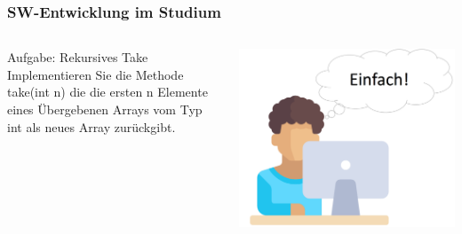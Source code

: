 \begin{frame}[fragile]
	\frametitle{SW-Entwicklung im Studium}
	\begin{columns}
		\begin{column}{.5\textwidth}
			Aufgabe: Rekursives Take
			\newline\newline
			Implementieren Sie die Methode take(int n) die
			die ersten n Elemente eines Übergebenen Arrays
			vom Typ int als neues Array zurückgibt.
		\end{column}
		\begin{column}{.5\textwidth}
			\center\includegraphics[width=1\textwidth,
			keepaspectratio=true]{bilder/student.png}
		\end{column}
	\end{columns}
\end{frame}

